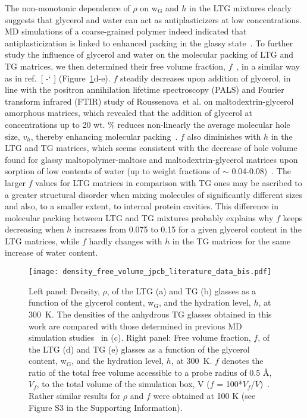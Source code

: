 \documentclass[journal=jpcbfk,manuscript=article]{achemso}
\newcommand*{\citen}[1]{%
\begingroup
\romannumeral-`\x %
\setcitestyle{numbers}%
\cite{#1}%
\endgroup   
}
\begin{document}
\begin{singlespacing}
The non-monotonic dependence of $\rho$ on w$_{\textrm{G}}$ and $h$ in the LTG mixtures clearly suggests that
glycerol and water can act as antiplasticizers at low concentrations. MD simulations of a coarse-grained polymer indeed 
indicated that antiplasticization is linked to enhanced packing in the glassy state~\cite{Riggleman2010}.
To further study the influence of glycerol and water on the molecular packing of LTG and TG matrices, 
we then determined their free volume fraction, $f$~\cite{Limbach2008}, in a similar way as in ref.~[\citen{Molinero2003}] 
(Figure~\ref{density_free_volume}d-e). $f$ steadily decreases upon addition of glycerol, in line with the 
positron annihilation lifetime spectroscopy (PALS) and Fourier transform infrared (FTIR) study of Roussenova~et al. on maltodextrin-glycerol
amorphous matrices, which revealed that the addition of glycerol at concentrations up to 20 wt. \% reduces non-linearly 
the average molecular hole size, $v_{h}$, thereby enhancing molecular
packing~\cite{Roussenova2014}. $f$ also diminishes with $h$ in the LTG and TG matrices, which seems consistent
with the decrease of hole volume found for glassy maltopolymer-maltose and maltodextrin-glycerol matrices upon sorption
of low contents of water (up to weight fractions of $\sim$ 0.04-0.08)~\cite{Townrow2010,Roussenova2010,Roussenova2014,Ubbink2016}.
The larger $f$ values for LTG matrices in comparison with TG ones may be ascribed to a greater structural disorder
when mixing molecules of significantly different sizes and also, to a smaller extent, to internal protein cavities.
This difference in molecular packing between LTG and TG mixtures probably explains why $f$ keeps decreasing when $h$ 
increases from 0.075 to 0.15 for a given glycerol content in the LTG matrices, while $f$ hardly changes with $h$ in the TG matrices 
for the same increase of water content.

\newpage

\begin{figure}[htbp]
\texttt{[image: density\_free\_volume\_jpcb\_literature\_data\_bis.pdf]}
\caption{\label{density_free_volume}
Left panel: Density, $\rho$, of the LTG (a) and TG (b) glasses as a function of the glycerol content, w$_{\textrm{G}}$,
and the hydration level, $h$, at 300~K. The densities of the anhydrous TG glasses obtained in this work are compared with those
determined in previous MD simulation studies~\cite{Dirama2005,Riggleman2008,Averett2012,Magazu2010} in (c).
Right panel: Free volume fraction, $f$, of the LTG (d) and TG (e) glasses as a function of the glycerol content, 
w$_{\textrm{G}}$, and the hydration level, $h$, at 300~K. $f$ denotes the ratio of the total free volume accessible to a probe radius of 0.5 \AA \/, 
$V_{f}$, to the total volume of the simulation box, V ($f$ = 100*$V_{f}$/$V$)~\cite{Limbach2008}. 
Rather similar results for $\rho$ and $f$ were obtained at 100 K (see Figure S3 in the Supporting Information).
}
\end{figure}


\end{singlespacing}
\end{document}
